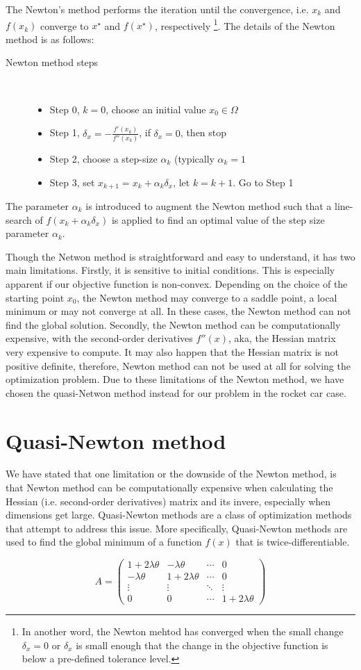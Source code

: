The Newton's method performs the iteration until the convergence, i.e. $x_k$ and $f(x_k)$ converge to $x^\star$ and $f(x^\star)$, respectively \footnote{In another word, the Newton mehtod has converged when the small change $\delta_x =0$ or $\delta_x$ is small enough that the change in the objective function is below a pre-defined tolerance level.}. The details of the Newton method is as follows: 
\begin{description}
	\item[Newton method steps]\ 
	\begin{itemize}
		\item Step 0, $k=0$, choose an initial value $x_0 \in \Omega$ 
		\item Step 1, $\delta_x  = - \frac{ f'(x_k)}{f''(x_k)}$, if $\delta_x =0$, then stop
		\item Step 2, choose a step-size $\alpha_k$ (typically $\alpha_k =1$
		\item Step 3, set $x_{k+1}  = x_k + \alpha_k \delta_x $, let $k= k+1$. Go to Step 1
	\end{itemize}
\end{description}

The parameter $\alpha_k$ is introduced to augment the Newton method such that a line-search of $f(x_k + \alpha_k \delta_x)$ is applied to find an optimal value of the step size parameter $\alpha_k$. 

Though the Netwon method is straightforward and easy to understand, it has two main limitations. Firstly, it is sensitive to initial conditions. This is especially apparent if our objective function is non-convex. Depending on the choice of the starting point $x_0$, the Newton method may converge to a saddle point, a local minimum or may not converge at all. In these cases, the Newton method can not find the global solution. Secondly, the Newton method can be computationally expensive, with the second-order derivatives $f''(x)$, aka, the Hessian matrix very expensive to compute. It may also happen that the Hessian matrix is not positive definite, therefore, Newton method can not be used at all for solving the optimization problem. Due to these limitations of the Newton method, we have chosen the quasi-Netwon method instead for our problem in the rocket car case. 

\section{Quasi-Newton method}
We have stated that one limitation or the downside of the Newton method, is that Newton method can be computationally expensive when calculating the Hessian (i.e. second-order derivatives)  matrix and its invere, especially when dimensions get large. Quasi-Newton methods are a class of optimization methods that attempt to address this issue. More specifically, Quasi-Newton methods are used to find the global minimum of a function $f(x)$ that is twice-differentiable. 



\begin{equation} 
	A = 
	\begin{pmatrix}
		1+2\lambda \theta  & -\lambda \theta  & \cdots & 0 \\
		-\lambda \theta  & 1+2\lambda \theta & \cdots & 0\\
		\vdots  & \vdots  & \ddots & \vdots  \\
		0 & 0 & \cdots & 1+2\lambda \theta
	\end{pmatrix}
\end{equation}

